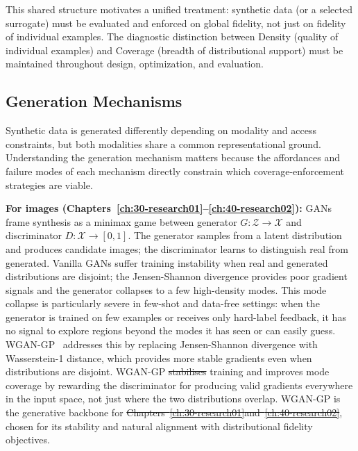 \documentclass[12pt, a4paper, twoside]{book}
\makeatletter
\numberwithin{equation}{chapter}
\theoremstyle{plain}
\theoremstyle{definition}
\theoremstyle{remark}
\newenvironment{foldable}{}{}
\providecommand{\DIFaddtex}[1]{{\protect\color{blue}\uwave{#1}}} %
\providecommand{\DIFdeltex}[1]{{\protect\color{red}\sout{#1}}} %
\providecommand{\DIFaddbegin}{} %
\providecommand{\DIFaddend}{} %
\providecommand{\DIFdelbegin}{} %
\providecommand{\DIFdelend}{} %
\providecommand{\DIFadd}[1]{\texorpdfstring{\DIFaddtex{#1}}{#1}} %
\providecommand{\DIFdel}[1]{\texorpdfstring{\DIFdeltex{#1}}{}} %
\newcommand{\DIFscaledelfig}{0.5}
\newlength{\DIFdelgraphicswidth} %
\newlength{\DIFdelgraphicsheight} %
\newcommand{\DIFaddincludegraphics}[2][]{{\color{blue}\fbox{\DIFOincludegraphics[#1]{#2}}}} %
\newcommand{\DIFdelincludegraphics}[2][]{%
\sbox{\DIFdelgraphicsbox}{\DIFOincludegraphics[#1]{#2}}%
\settoboxwidth{\DIFdelgraphicswidth}{\DIFdelgraphicsbox} %
\settoboxtotalheight{\DIFdelgraphicsheight}{\DIFdelgraphicsbox} %
\scalebox{\DIFscaledelfig}{%
\parbox[b]{\DIFdelgraphicswidth}{\usebox{\DIFdelgraphicsbox}\\[-\baselineskip] \rule{\DIFdelgraphicswidth}{0em}}\llap{\resizebox{\DIFdelgraphicswidth}{\DIFdelgraphicsheight}{%
\setlength{\unitlength}{\DIFdelgraphicswidth}%
\begin{picture}(1,1)%
\thicklines\linethickness{2pt} %
{\color[rgb]{1,0,0}\put(0,0){\framebox(1,1){}}}%
{\color[rgb]{1,0,0}\put(0,0){\line( 1,1){1}}}%
{\color[rgb]{1,0,0}\put(0,1){\line(1,-1){1}}}%
\end{picture}%
}\hspace*{3pt}}} %
} %
\DeclareRobustCommand{\DIFaddbegin}{\DIFOaddbegin \let\includegraphics\DIFaddincludegraphics} %
\DeclareRobustCommand{\DIFaddend}{\DIFOaddend \let\includegraphics\DIFOincludegraphics} %
\DeclareRobustCommand{\DIFdelbegin}{\DIFOdelbegin \let\includegraphics\DIFdelincludegraphics} %
\DeclareRobustCommand{\DIFdelend}{\DIFOaddend \let\includegraphics\DIFOincludegraphics} %
\let\sout@orig\sout %
\renewcommand{\sout}[1]{\ifmmode\text{\sout@orig{\ensuremath{#1}}}\else\sout@orig{#1}\fi} %
\makeatother
\begin{document}
\begin{foldable}
  This shared structure motivates a unified treatment: synthetic data (or a selected surrogate) must be evaluated and enforced on global fidelity, not just on fidelity of individual examples.
  The diagnostic distinction between Density (quality of individual examples) and Coverage (breadth of distributional support) must be maintained throughout design, optimization, and evaluation.
\end{foldable}

\subsection{Generation Mechanisms} \label{sec:25-background-distribution-mechanisms}
\begin{foldable}
  Synthetic data is generated differently depending on modality and access constraints, but both modalities share a common representational ground.
  Understanding the generation mechanism matters because the affordances and failure modes of each mechanism directly constrain which coverage-enforcement strategies are viable.
\end{foldable}

\begin{foldable}
  \textbf{For images (Chapters~\ref{ch:30-research01}--\ref{ch:40-research02}):}
  \Acp{GAN}~\cite{goodfellow2014generative} frame synthesis as a minimax game between generator $G: \mathcal{Z} \to \mathcal{X}$ and discriminator $D: \mathcal{X} \to [0,1]$.
  The generator samples from a latent distribution and produces candidate images; the discriminator learns to distinguish real from generated.
  Vanilla GANs suffer training instability when real and generated distributions are disjoint; the Jensen-Shannon divergence provides poor gradient signals and the generator collapses to a few high-density modes.
  This mode collapse is particularly severe in few-shot and data-free settings: when the generator is trained on few examples or receives only hard-label feedback, it has no signal to explore regions beyond the modes it has seen or can easily guess.
  \Ac{WGAN-GP}~\cite{gulrajani2017improved} addresses this by replacing Jensen-Shannon divergence with Wasserstein-1 distance, which provides more stable gradients even when distributions are disjoint.
  \Ac{WGAN-GP} \DIFdelbegin \DIFdel{stabilises }\DIFdelend \DIFaddbegin \DIFadd{stabilizes }\DIFaddend training and improves mode coverage by rewarding the discriminator for producing valid gradients everywhere in the input space, not just where the two distributions overlap.
  \Ac{WGAN-GP} is the generative backbone for \DIFdelbegin \DIFdel{Chapters~\ref{ch:30-research01}and~\ref{ch:40-research02}}\DIFdelend \DIFaddbegin \DIFadd{Chapter~\ref{ch:30-research01}}\DIFaddend , chosen for its stability and natural alignment with distributional fidelity objectives.
\end{foldable}
\end{document}
